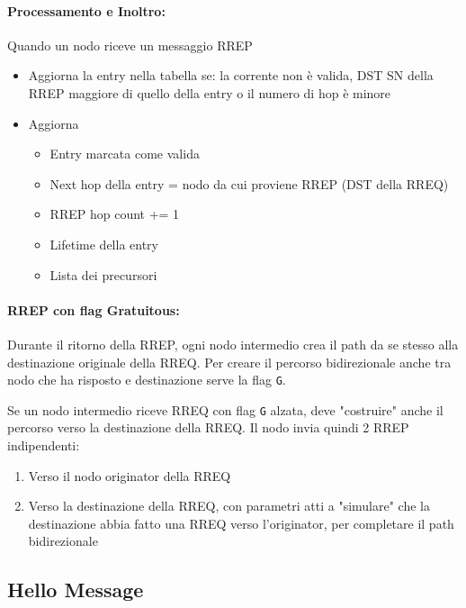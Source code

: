 \paragraph{Processamento e Inoltro:} Quando un nodo riceve un messaggio RREP
\begin{itemize}
    \item Aggiorna la entry nella tabella se: la corrente non è valida, DST SN della RREP maggiore di quello della entry o il numero di hop è minore
    
    \item Aggiorna
    \begin{itemize}
        \item Entry marcata come valida
        
        \item Next hop della entry = nodo da cui proviene RREP (DST della RREQ)
        
        \item RREP hop count += 1
        
        \item Lifetime della entry 
        
        \item Lista dei precursori
    \end{itemize}
\end{itemize}

\paragraph{RREP con flag Gratuitous:} Durante il ritorno della RREP, ogni nodo intermedio crea il path da se stesso alla destinazione originale della RREQ. Per creare il percorso bidirezionale anche tra nodo che ha risposto e destinazione serve la flag \texttt{G}. 

Se un nodo intermedio riceve RREQ con flag \texttt{G} alzata, deve "costruire" anche il percorso verso la destinazione della RREQ. Il nodo invia quindi 2 RREP indipendenti: 
\begin{enumerate}
    \item Verso il nodo originator della RREQ
    
    \item Verso la destinazione della RREQ, con parametri atti a "simulare" che la destinazione abbia fatto una RREQ verso l'originator, per completare il path bidirezionale
\end{enumerate}

\subsection{Hello Message}

